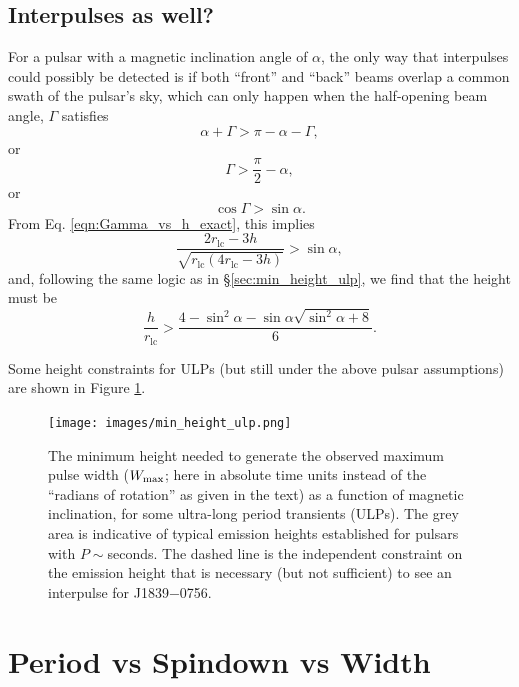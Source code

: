 \documentclass{book}
\newcommand{\rL}{r_\text{lc}} %
\begin{document}
\subsection{Interpulses as well?}

For a pulsar with a magnetic inclination angle of $\alpha$, the only way that interpulses could possibly be detected is if both ``front'' and ``back'' beams overlap a common swath of the pulsar's sky, which can only happen when the half-opening beam angle, $\Gamma$ satisfies
\begin{equation}
  \alpha + \Gamma > \pi - \alpha - \Gamma,
\end{equation}
or
\begin{equation}
  \Gamma > \frac{\pi}{2} - \alpha,
\end{equation}
or
\begin{equation}
  \cos\Gamma > \sin\alpha.
\end{equation}
From Eq. \eqref{eqn:Gamma_vs_h_exact}, this implies
\begin{equation}
  \frac{2\rL - 3h}{\sqrt{\rL(4\rL - 3h)}} > \sin\alpha,
\end{equation}
and, following the same logic as in \S\ref{sec:min_height_ulp}, we find that the height must be
\begin{equation}
  \frac{h}{\rL} > \frac{4 - \sin^2\alpha - \sin\alpha \sqrt{\sin^2\alpha + 8}}{6}.
\end{equation}

Some height constraints for ULPs (but still under the above pulsar assumptions) are shown in Figure \ref{fig:min_height_ulp}.
\begin{figure}[th]
    \centering
    \texttt{[image: images/min\_height\_ulp.png]}
    \caption{The minimum height needed to generate the observed maximum pulse width ($W_{\rm max}$; here in absolute time units instead of the ``radians of rotation'' as given in the text) as a function of magnetic inclination, for some ultra-long period transients (ULPs). The grey area is indicative of typical emission heights established for pulsars with $P{\sim}$seconds. The dashed line is the independent constraint on the emission height that is necessary (but not sufficient) to see an interpulse for J1839$-$0756.}
    \label{fig:min_height_ulp}
\end{figure}

\section{Period vs Spindown vs Width}
\label{sec:p0-p1-w10}
\end{document}
